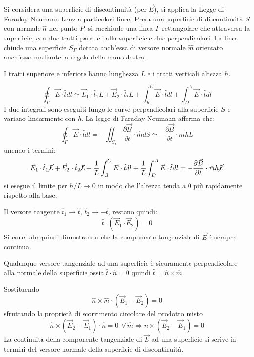 Si considera una superficie di discontinuità (per $\vec{E}$), si applica la Legge di 
Faraday-Neumann-Lenz a particolari linee.
Presa una superficie di discontinuità $S$ con normale $\hat{n}$ nel punto $P$, si racchiude una linea
$\Gamma$ rettangolare che attraversa la superficie, con due tratti paralleli alla superficie e due
perpendicolari. La linea chiude una superficie $S_\Gamma$ dotata anch'essa di versore normale $\hat{m}$
orientato anch'esso mediante la regola della mano destra.

I tratti superiore e inferiore hanno lunghezza $L$ e i tratti verticali altezza $h$.

$$
\oint_{\Gamma}\vec{E}\cdot\hat{t}dl \simeq \vec{E}_1 \cdot\hat{t}_1 L + \vec{E}_2 \cdot\hat{t}_2 L +
\int_B^C \vec{E}\cdot\hat{t} dl + \int_D^A\vec{E}\cdot\hat{t}dl
$$
I due integrali sono eseguiti lungo le curve perpendicolari alla superficie $S$ e variano linearmente 
con $h$.
La legge di Faraday-Neumann afferma che:
$$
\oint_{\Gamma}\vec{E}\cdot\hat{t}dl = 
-\iint_{S_\Gamma} \frac{\partial\vec{B}}{\partial t}\cdot \hat{m}dS \simeq 
- \frac{\partial\vec{B}}{\partial t} \cdot \hat{m} h L
$$
unendo i termini:
$$
\vec{E}_1 \cdot\hat{t}_1 \cancel{L} + \vec{E}_2 \cdot\hat{t}_2 \cancel{L} +
\frac{1}{L}\int_B^C \vec{E}\cdot\hat{t} dl + \frac{1}{L}\int_D^A\vec{E}\cdot\hat{t}dl
= - \frac{\partial \vec{B}}{\partial t}\cdot \hat{m} h \cancel{L}
$$
si esegue il limite per $h/L \to 0$ in modo che l'altezza tenda a 0 più rapidamente rispetto
alla base.

Il versore tangente $\hat{t}_1 \to \hat{t},\ \hat{t}_2\to -\hat{t}$, restano quindi:
$$
\hat{t}\cdot(\vec{E}_1\cdot\vec{E}_2) = 0
$$
Si conclude quindi dimostrando che la componente tangenziale di $\vec{E}$ è sempre continua.

Qualunque versore tangenziale ad una superficie è sicuramente perpendicolare alla normale della
superficie ossia $\hat{t}\cdot\hat{n} = 0$ quindi $\hat{t} = \hat{n}\times\hat{m}$.

Sostituendo 
$$
\hat{n}\times\hat{m}\cdot(\vec{E}_1-\vec{E}_2) = 0
$$
sfruttando la proprietà di scorrimento circolare del prodotto misto 
$$
\hat{n}\times(\vec{E}_2-\vec{E}_1)\cdot\hat{n} = 0 \ \ \forall\ \hat{m} \Rightarrow
\hat{n}\times(\vec{E}_2-\vec{E}_1) = 0
$$
La continuità della componente tangenziale di $\vec{E}$ ad una superficie si scrive in termini
del versore normale della superficie di discontinuità.


